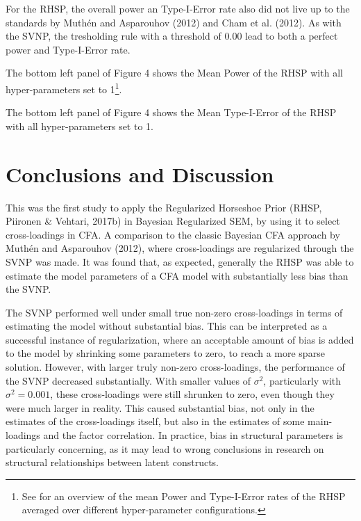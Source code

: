 \documentclass[
  english,
  man, donotrepeattitle,floatsintext]{apa6}
\begin{document}
For the RHSP, the overall power an Type-I-Error rate also did not live up to the standards by Muthén and Asparouhov (2012) and Cham et al. (2012). As with the SVNP, the tresholding rule with a threshold of 0.00 lead to both a perfect power and Type-I-Error rate.

The bottom left panel of Figure 4 shows the Mean Power of the RHSP with all hyper-parameters set to 1\footnote{See for an overview of the mean Power and Type-I-Error rates of the RHSP averaged over different hyper-parameter configurations.}.

The bottom left panel of Figure 4 shows the Mean Type-I-Error of the RHSP with all hyper-parameters set to 1.

\hypertarget{conclusions-and-discussion}{%
\section{Conclusions and Discussion}\label{conclusions-and-discussion}}

This was the first study to apply the Regularized Horseshoe Prior (RHSP, Piironen \& Vehtari, 2017b) in Bayesian Regularized SEM, by using it to select cross-loadings in CFA. A comparison to the classic Bayesian CFA approach by Muthén and Asparouhov (2012), where cross-loadings are regularized through the SVNP was made. It was found that, as expected, generally the RHSP was able to estimate the model parameters of a CFA model with substantially less bias than the SVNP.

The SVNP performed well under small true non-zero cross-loadings in terms of estimating the model without substantial bias. This can be interpreted as a successful instance of regularization, where an acceptable amount of bias is added to the model by shrinking some parameters to zero, to reach a more sparse solution. However, with larger truly non-zero cross-loadings, the performance of the SVNP decreased substantially. With smaller values of \(\sigma^2\), particularly with \(\sigma^2 = 0.001\), these cross-loadings were still shrunken to zero, even though they were much larger in reality. This caused substantial bias, not only in the estimates of the cross-loadings itself, but also in the estimates of some main-loadings and the factor correlation. In practice, bias in structural parameters is particularly concerning, as it may lead to wrong conclusions in research on structural relationships between latent constructs.
\end{document}
